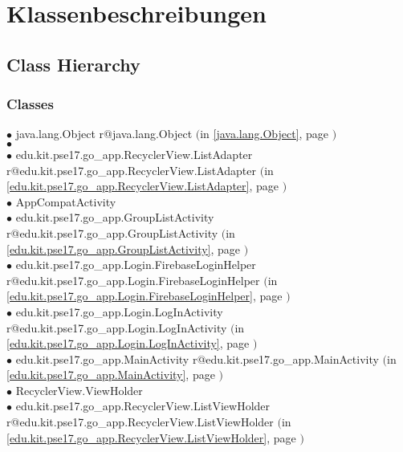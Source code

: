 \documentclass[11pt,a4paper]{report}
\makeatletter
\newcommand{\refdefined}[1]{
\expandafter\ifx\csname r@#1\endcsname\relax
\relax\else
{$($in \ref{#1}, page \pageref{#1}$)$}\fi}
\makeatother
\begin{document}
\chapter{Klassenbeschreibungen} {


\section*{Class Hierarchy}{
\thispagestyle{empty}
\subsection*{Classes}
{\raggedright
\hspace{0.0cm} $\bullet$ java.lang.Object {\tiny \refdefined{java.lang.Object}} \\
\hspace{1.0cm} $\bullet$  {\tiny } \\
\hspace{2.0cm} $\bullet$ edu.kit.pse17.go\_app.RecyclerView.ListAdapter {\tiny \refdefined{edu.kit.pse17.go_app.RecyclerView.ListAdapter}} \\
\hspace{1.0cm} $\bullet$ AppCompatActivity {\tiny } \\
\hspace{2.0cm} $\bullet$ edu.kit.pse17.go\_app.GroupListActivity {\tiny \refdefined{edu.kit.pse17.go_app.GroupListActivity}} \\
\hspace{2.0cm} $\bullet$ edu.kit.pse17.go\_app.Login.FirebaseLoginHelper {\tiny \refdefined{edu.kit.pse17.go_app.Login.FirebaseLoginHelper}} \\
\hspace{2.0cm} $\bullet$ edu.kit.pse17.go\_app.Login.LogInActivity {\tiny \refdefined{edu.kit.pse17.go_app.Login.LogInActivity}} \\
\hspace{2.0cm} $\bullet$ edu.kit.pse17.go\_app.MainActivity {\tiny \refdefined{edu.kit.pse17.go_app.MainActivity}} \\
\hspace{1.0cm} $\bullet$ RecyclerView.ViewHolder {\tiny } \\
\hspace{2.0cm} $\bullet$ edu.kit.pse17.go\_app.RecyclerView.ListViewHolder {\tiny \refdefined{edu.kit.pse17.go_app.RecyclerView.ListViewHolder}} \\
}}}
\end{document}
